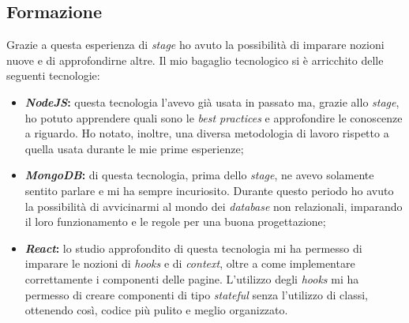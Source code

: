 \subsection{Formazione}
Grazie a questa esperienza di \emph{stage} ho avuto la possibilità di imparare nozioni nuove e di approfondirne altre.
Il mio bagaglio tecnologico si è arricchito delle seguenti tecnologie:
\begin{itemize}
  \item \textbf{\emph{NodeJS}:} questa tecnologia l'avevo già usata in passato ma, grazie allo \emph{stage}, ho potuto apprendere quali sono le \emph{best practices} e approfondire le conoscenze a riguardo. Ho notato, inoltre, una diversa metodologia di lavoro rispetto a quella usata durante le mie prime esperienze;
  \item \textbf{\emph{MongoDB}:} di questa tecnologia, prima dello \emph{stage}, ne avevo solamente sentito parlare e mi ha sempre incuriosito. Durante questo periodo ho avuto la possibilità di avvicinarmi al mondo dei \emph{database} non relazionali, imparando il loro funzionamento e le regole per una buona progettazione;
  \item \textbf{\emph{React}:} lo studio approfondito di questa tecnologia mi ha permesso di imparare le nozioni di \emph{hooks} e di \emph{context}, oltre a come implementare correttamente i componenti delle pagine. L'utilizzo degli \emph{hooks} mi ha permesso di creare componenti di tipo \emph{stateful} senza l'utilizzo di classi, ottenendo così, codice più pulito e meglio organizzato.
\end{itemize}

